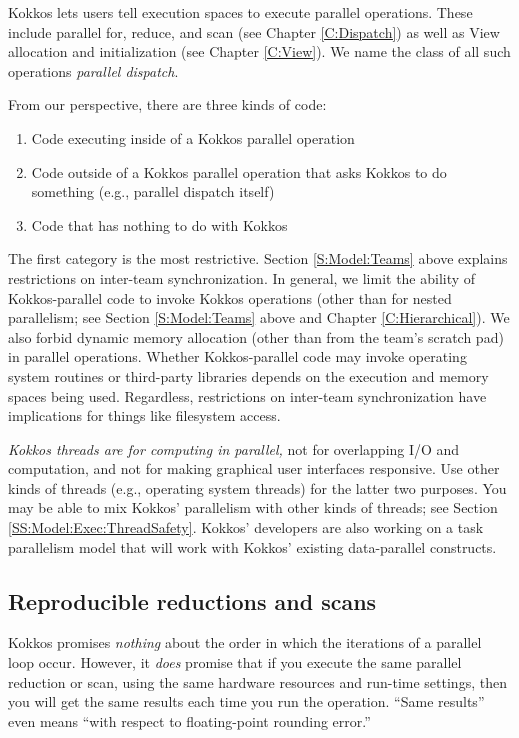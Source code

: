 Kokkos lets users tell execution spaces to execute parallel operations.
These include parallel for, reduce, and scan (see Chapter \ref{C:Dispatch})
as well as View allocation and initialization (see Chapter \ref{C:View}).
We name the class of all such operations \emph{parallel dispatch}.

From our perspective, there are three kinds of code:
\begin{enumerate}
\item Code executing inside of a Kokkos parallel operation
\item Code outside of a Kokkos parallel operation that asks Kokkos to
  do something (e.g., parallel dispatch itself)
\item Code that has nothing to do with Kokkos
\end{enumerate}
The first category is the most restrictive.
Section \ref{S:Model:Teams} above explains restrictions on inter-team synchronization.
In general, we limit the ability of Kokkos-parallel code to invoke Kokkos operations
(other than for nested parallelism; 
see Section \ref{S:Model:Teams} above and Chapter \ref{C:Hierarchical}).
We also forbid dynamic memory allocation (other than from the team's scratch pad) in parallel operations.
Whether Kokkos-parallel code may invoke operating system routines or third-party libraries
depends on the execution and memory spaces being used.
Regardless, restrictions on inter-team synchronization have implications for things like filesystem access.

\emph{Kokkos threads are for computing in parallel,}
not for overlapping I/O and computation,
and not for making graphical user interfaces responsive.
Use other kinds of threads (e.g., operating system threads) for the latter two purposes.
You may be able to mix Kokkos' parallelism with other kinds of threads;
see Section \ref{SS:Model:Exec:ThreadSafety}.
Kokkos' developers are also working on a task parallelism model
that will work with Kokkos' existing data-parallel constructs.

\subsection{Reproducible reductions and scans}\label{SS:Model:Exec:Repro}

Kokkos promises \emph{nothing} about the order in which the iterations of a parallel loop occur.
However, it \emph{does} promise that if you execute the same parallel reduction or scan,
using the same hardware resources and run-time settings,
then you will get the same results each time you run the operation.
``Same results'' even means ``with respect to floating-point rounding error.''

